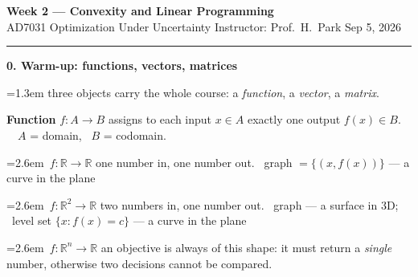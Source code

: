 \documentclass[10pt]{article}
\newcommand{\beat}[2]{%
  \par\bigskip\vspace{4pt}
  {\color{ruleink}\rule{\textwidth}{1pt}}\par\nobreak\vspace{4pt}
  {\large\bfseries #1.\; #2}\par\nobreak\vspace{6pt}}
\newenvironment{board}{%
  \par\vspace{4pt}
  \begingroup\leftskip=1.3em\relax\parskip=2pt\relax}{%
  \par\endgroup\vspace{4pt}}
\newcommand{\bul}{\hangindent=2.6em\hangafter=1\hspace{1.2em}\textbullet\ \ignorespaces}
\begin{document}
{\Large\bfseries Week 2 --- Convexity and Linear Programming}\\[2pt]
{\small AD7031 Optimization Under Uncertainty \quad\textbullet\quad Instructor: Prof.\ H.\ Park \quad\textbullet\quad Sep 5, 2026}

\beat{0}{Warm-up: functions, vectors, matrices}
\begin{board}
three objects carry the whole course: a \emph{function}, a \emph{vector}, a \emph{matrix}.
\vspace{8pt}

\textbf{Function} \quad $f : A \to B$ assigns to each input $x \in A$ exactly one output $f(x) \in B$.
\ \ $A$ = domain, \ $B$ = codomain.
\vspace{4pt}

\bul $f : \mathbb{R} \to \mathbb{R}$ \quad one number in, one number out.
      \ graph $= \{(x, f(x))\}$ --- a curve in the plane
\vspace{3pt}

\bul $f : \mathbb{R}^2 \to \mathbb{R}$ \quad two numbers in, one number out.
      \ graph --- a surface in 3D; \ level set $\{x : f(x) = c\}$ --- a curve in the plane
\vspace{3pt}

\bul $f : \mathbb{R}^n \to \mathbb{R}$ \quad an objective is always of this shape: it must return a
      \emph{single} number, otherwise two decisions cannot be compared.
\vspace{6pt}


\end{board}
\end{document}
